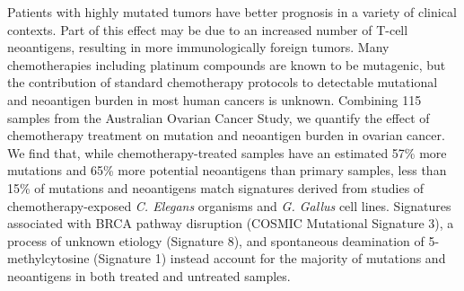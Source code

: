 Patients with highly mutated tumors have better prognosis in a variety of clinical contexts. Part of this effect may be due to an increased number of T-cell neoantigens, resulting in more immunologically foreign tumors. Many chemotherapies including platinum compounds are known to be mutagenic, but the contribution of standard chemotherapy protocols to detectable mutational and neoantigen burden in most human cancers is unknown. Combining 115 samples from the Australian Ovarian Cancer Study, we quantify the effect of chemotherapy treatment on mutation and neoantigen burden in ovarian cancer. We find that, while chemotherapy-treated samples have an estimated 57\% more mutations and 65\% more potential neoantigens than primary samples, less than 15\% of mutations and neoantigens match signatures derived from studies of chemotherapy-exposed \textit{C. Elegans} organisms and \textit{G. Gallus} cell lines. Signatures associated with BRCA pathway disruption (COSMIC Mutational Signature 3), a process of unknown etiology (Signature 8), and spontaneous deamination of 5-methylcytosine (Signature 1) instead account for the majority of mutations and neoantigens in both treated and untreated samples.


